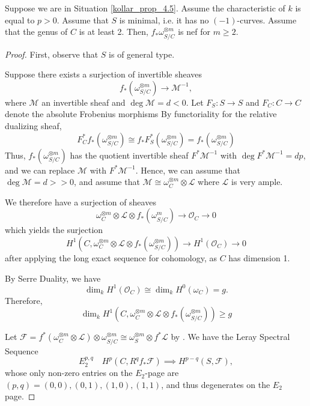 \begin{lemma}\label{4.5_minimal_base_genus_2_char_p}
Suppose we are in Situation \ref{kollar_prop_4.5}.
Assume the characteristic of $k$ is equal to $p>0$.
Assume that $S$ is minimal, i.e. it has no $(-1)$-curves.
Assume that the genus of $C$ is at least 2.
Then, $f_*\omega_{S/C}^{\otimes m}$ is nef for $m \geq 2$.
\end{lemma}

\begin{proof}
First, observe that $S$ is of general type. 

Suppose there exists a surjection of invertible sheaves
$$f_*(\omega^{\otimes m}_{S/C})\to \mathcal{M}^{-1},$$
where $\mathcal{M}$ an invertible sheaf and $\deg \mathcal{M}=d<0$.
Let $F_S:S\to S$ and $F_C:C\to C$ denote the absolute Frobenius morphisms
By functoriality for the relative dualizing sheaf,
$$
F_C^*f_*(\omega^{\otimes m}_{S/C})\cong f_*F_S^*(\omega^{\otimes m}_{S/C})=f_*(\omega^{\otimes m}_{S/C})
$$
Thus, $f_*(\omega^{\otimes m}_{S/C})$ has the quotient invertible sheaf $F^*\mathcal{M}^{-1}$ with $\deg F^*\mathcal{M}^{-1}=dp$, and we can replace $\mathcal{M}$ with $F^{*}\mathcal{M}^{-1}$. Hence, we can assume that $\deg \mathcal{M}=d>>0$, and assume that $\mathcal{M}\cong \omega_{C}^{\otimes m}\otimes \mathcal{L}$ where $\mathcal{L}$ is very ample.

We therefore have a surjection of sheaves
$$\omega_C^{\otimes m}\otimes \mathcal{L} \otimes f_*(\omega^m_{S/C})\to\mathcal{O}_C\to 0$$
which yields the surjection
$$H^1(C, \omega^{\otimes m}_C\otimes \mathcal{L}\otimes f_*(\omega^{\otimes m}_{S/C}))\to H^1(\mathcal{O}_C)\to 0$$
after applying the long exact sequence for cohomology, as $C$ has dimension 1.

By Serre Duality, we have
$$\dim_k H^1(\mathcal{O}_C)\cong \dim_k H^0(\omega_C)=g.$$
Therefore, $$\dim_k H^1(C, \omega^{\otimes m}_C\otimes \mathcal{L}\otimes f_*(\omega^{\otimes m}_{S/C}))\geq g$$

Let $\mathcal{F}=f^*(\omega^{\otimes m}_C\otimes \mathcal{L})\otimes \omega^{\otimes m}_{S/C}\cong \omega_{S}^{\otimes m}\otimes f^{*}\mathcal{L}$ by . We have the Leray Spectral Sequence
$$E_2^{p,q} \quad H^p(C, R^qf_*\mathcal{F})\implies H^{p-q}(S,\mathcal{F}),$$
whose only non-zero entries on the $E_2$-page are $(p,q)=(0,0),(0,1),(1,0),(1,1)$, and thus degenerates on the $E_2$ page.



\end{proof}
